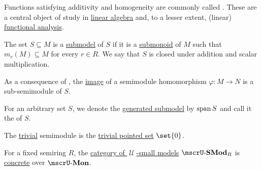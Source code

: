 \begin{definition}
\begin{thmenum}
    Functions satisfying additivity and homogeneity are commonly called . These are a central object of study in \hyperref[sec:linear_algebra]{linear algebra} and, to a lesser extent, (linear) \hyperref[sec:functional_analysis]{functional analysis}.

     The set \( S \subseteq M \) is a \hyperref[thm:substructure_is_model]{submodel} of \( S \) if it is a \hyperref[def:monoid/submodel]{submonoid} of \( M \) such that \( m_r(M) \subseteq M \) for every \( r \in R \). We say that \( S \) is closed under addition and scalar multiplication.

    As a consequence of , the \hyperref[def:multi_valued_function/image]{image} of a semimodule homomorphism \( \varphi: M \to N \) is a sub-semimodule of \( S \).

    For an arbitrary set \( S \), we denote the \hyperref[def:first_order_generated_substructure]{generated submodel} by \( \operatorname{span}{ S } \) and call it the  of \( S \).

     The \hyperref[thm:substructures_form_complete_lattice/bottom]{trivial} semimodule is the \hyperref[def:pointed_set/trivial]{trivial pointed set} \( \set{ 0 } \).

     For a fixed semiring \( R \), the \hyperref[def:category_of_small_first_order_models]{category of \( \mscrU \)-small models} \( \ucat{SMod}_R \) is \hyperref[def:concrete_category]{concrete} over \hyperref[def:monoid]{\( \ucat{Mon} \)}.
  \end{thmenum}
\end{definition}
